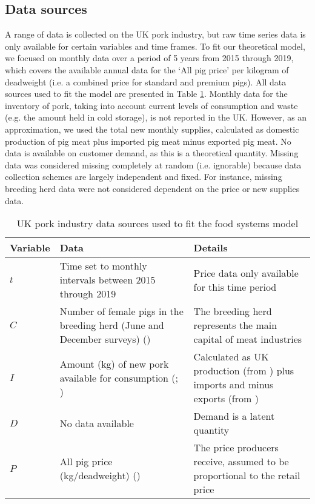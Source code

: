 \documentclass[12pt]{article}
\begin{document}
\subsection{Data sources}
A range of data is collected on the UK pork industry, but raw time series data is only available for certain variables and time frames. To fit our theoretical model, we focused on monthly data over a period of 5 years from 2015 through 2019, which covers the available annual data for the `All pig price' per kilogram of deadweight (i.e. a combined price for standard and premium pigs). All data sources used to fit the model are presented in Table \ref{table_data_sources}. Monthly data for the inventory of pork, taking into account current levels of consumption and waste (e.g. the amount held in cold storage), is not reported in the UK. However, as an approximation, we used the total new monthly supplies, calculated as domestic production of pig meat plus imported pig meat minus exported pig meat. No data is available on customer demand, as this is a theoretical quantity. Missing data was considered missing completely at random (i.e. ignorable) because data collection schemes are largely independent and fixed. For instance, missing breeding herd data were not considered dependent on the price or new supplies data.


\begin{table}[]
  \centering
  \footnotesize
  \begin{tabular}{p{1.5cm}p{7cm}p{6cm}}
    \textbf{Variable} & \textbf{Data} & \textbf{Details} \\ \hline
    $t$ & Time set to monthly intervals between 2015 through 2019 & Price data only available for this time period \\
    $C$
    & Number of female pigs in the breeding herd (June and December surveys) (\cite{DEFRAlivestocknumbers})
    & The breeding herd represents the main capital of meat industries \\
    $I$
    & Amount (kg) of new pork available for consumption (\cite{DEFRApigcattlestats2020}; \cite{AHDBpigmeatrade})
    & Calculated as UK production (from \cite{DEFRApigcattlestats2020}) plus imports and minus exports (from \cite{AHDBpigmeatrade})  \\
    $D$ & No data available & Demand is a latent quantity \\
    $P$ & All pig price (kg/deadweight) (\cite{DEFRAlivestockprices}) & The price producers receive, assumed to be proportional to the retail price \\ \hline
  \end{tabular}
  \caption{UK pork industry data sources used to fit the food systems model}
  \label{table_data_sources}
\end{table}
\end{document}
